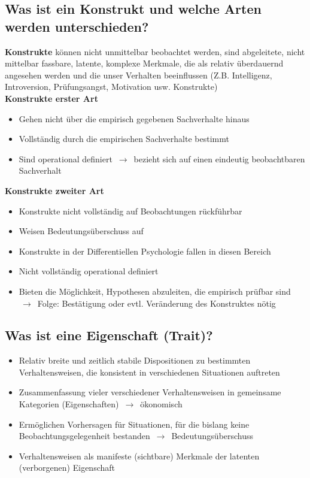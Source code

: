 \documentclass[a6paper,9pt,DIV=14]{scrartcl}
\begin{document}
\subsection{Was ist ein Konstrukt und welche Arten werden unterschieden?}
    \textbf{Konstrukte} können nicht unmittelbar beobachtet werden, sind abgeleitete, nicht mittelbar fassbare, latente, komplexe Merkmale, die als relativ überdauernd angesehen werden und die unser Verhalten beeinflussen (Z.B. Intelligenz, Introversion, Prüfungsangst, Motivation usw. Konstrukte)\\
    \textbf{Konstrukte erster Art}
    \begin{itemize}\itemsep-0.5ex
        \item Gehen nicht über die empirisch gegebenen Sachverhalte hinaus
        \item Vollständig durch die empirischen Sachverhalte bestimmt
        \item Sind operational definiert $\,\to\,$ bezieht sich auf einen eindeutig beobachtbaren Sachverhalt
    \end{itemize}
    \textbf{Konstrukte zweiter Art}
    \begin{itemize}\itemsep-0.5ex
        \item Konstrukte nicht vollständig auf Beobachtungen rückführbar
        \item Weisen Bedeutungsüberschuss auf
        \item Konstrukte in der Differentiellen Psychologie fallen in diesen Bereich
        \item Nicht vollständig operational definiert
        \item Bieten die Möglichkeit, Hypothesen abzuleiten, die empirisch prüfbar sind $\,\to\,$ Folge: Bestätigung oder evtl. Veränderung des Konstruktes nötig
    \end{itemize}
\subsection{Was ist eine Eigenschaft (Trait)?}%
    \begin{itemize}\itemsep-0.5ex
        \item Relativ breite und zeitlich stabile Dispositionen zu bestimmten
    Verhaltensweisen, die konsistent in verschiedenen Situationen auftreten
        \item Zusammenfassung vieler verschiedener Verhaltensweisen in
    gemeinsame Kategorien (Eigenschaften) $\,\to\,$ ökonomisch
        \item Ermöglichen Vorhersagen für Situationen, für die bislang keine
    Beobachtungsgelegenheit bestanden $\,\to\,$ Bedeutungsüberschuss
        \item Verhaltensweisen als manifeste (sichtbare) Merkmale der latenten
    (verborgenen) Eigenschaft
    \end{itemize}
\end{document}
